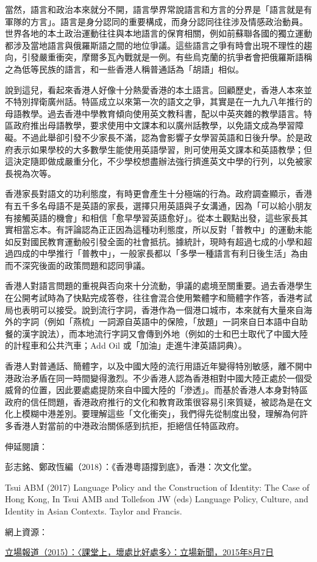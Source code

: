 當然，語言和政治本來就分不開，語言學界常說語言和方言的分界是「語言就是有軍隊的方言」。語言是身分認同的重要構成，而身分認同往往涉及情感政治動員。世界各地的本土政治運動往往與本地語言的保育相關，例如前蘇聯各國的獨立運動都涉及當地語言與俄羅斯語之間的地位爭議。這些語言之爭有時會出現不理性的趨向，引發嚴重衝突，摩爾多瓦內戰就是一例。有些烏克蘭的抗爭者會把俄羅斯語稱之為低等民族的語言，和一些香港人稱普通話為「胡語」相似。

說到這兒，看起來香港人好像十分熱愛香港的本土語言。回顧歷史，香港人本來並不特別捍衛廣州話。特區成立以來第一次的語文之爭，其實是在一九九八年推行的母語教學。過去香港中學教育傾向使用英文教科書，配以中英夾雜的教學語言。特區政府推出母語教學，要求使用中文課本和以廣州話教學，以免語文成為學習障礙。不過此舉卻引發不少家長不滿，認為會影響子女學習英語和日後升學。於是政府表示如果學校的大多數學生能使用英語學習，則可使用英文課本和英語教學；但這決定隨即做成嚴重分化，不少學校想盡辦法強行擠進英文中學的行列，以免被家長視為次等。

香港家長對語文的功利態度，有時更會產生十分極端的行為。政府調查顯示，香港有五千多名母語不是英語的家長，選擇只用英語與子女溝通，因為「可以給小朋友有接觸英語的機會」和相信「愈早學習英語愈好」。從本土觀點出發，這些家長其實相當忘本。有評論認為正正因為這種功利態度，所以反對「普教中」的運動未能如反對國民教育運動般引發全面的社會抵抗。據統計，現時有超過七成的小學和超過四成的中學推行「普教中」，一般家長都以「多學一種語言有利日後生活」為由而不深究後面的政策問題和認同爭議。

香港人對語言問題的重視與否向來十分流動，爭議的處境至關重要。過去香港學生在公開考試時為了快點完成答卷，往往會混合使用繁體字和簡體字作答，香港考試局也表明可以接受。說到流行字詞，香港作為一個港口城市，本來就有大量來自海外的字詞（例如「燕梳」一詞源自英語中的保險，「放題」一詞來自日本語中自助餐的漢字說法），而本地流行字詞又會傳到外地（例如的士和巴士取代了中國大陸的計程車和公共汽車；Add Oil 或「加油」走進牛津英語詞典）。

香港人對普通話、簡體字，以及中國大陸的流行用語近年變得特別敏感，離不開中港政治矛盾在同一時間變得激烈。不少香港人認為香港相對中國大陸正處於一個受威脅的位置，因此要處處提防來自中國大陸的「滲透」。而基於香港人本身對特區政府的信任問題，香港政府推行的文化和教育政策很容易引來質疑，被認為是在文化上模糊中港差別。要理解這些「文化衝突」，我們得先從制度出發，理解為何許多香港人對當前的中港政治關係感到抗拒，拒絕信任特區政府。


伸延閱讀：

彭志銘、鄭政恆編（2018）：《香港粵語撐到底》，香港：次文化堂。

Tsui ABM (2017) Language Policy and the Construction of Identity: The Case of Hong Kong, In Tsui AMB and Tollefson JW (eds) Language Policy, Culture, and Identity in Asian Contexts. Taylor and Francis.

網上資源：

\href{https://thestandnews.com/politics/普教中-勿狗衝-2-課堂上-壞處比好處多/}{立場報道（2015）：〈課堂上，壞處比好處多〉：立場新聞，2015年8月7日}